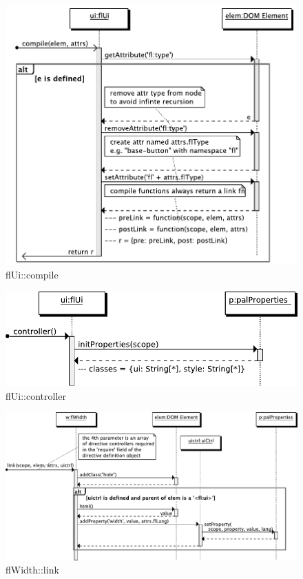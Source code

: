\begin{figure}[htb]
    \centering
    \includegraphics{figures/design/seqdia/ui-compile.pdf}
    \caption{flUi::compile}
    \label{fig:design-seqdia-ui-compile}
\end{figure}

\begin{figure}[htb]
    \centering
    \includegraphics{figures/design/seqdia/ui-controller.pdf}
    \caption{flUi::controller}
    \label{fig:design-seqdia-ui-controller}
\end{figure}

\begin{figure}
    \centering
    \includegraphics{figures/design/seqdia/width-link.pdf}
    \caption{flWidth::link}
    \label{fig:design-seqdia-width-link}
\end{figure}

